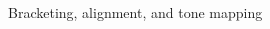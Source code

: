 \documentclass[12pt,a4paper,oneside,openright]{book}
\begin{document}
\begin{CJK}{UTF8}{}
\begin{figure}[htbp]
\begin{center}
\begin{minipage}[c]{.33\textwidth}
\begin{center}
      \end{center}
    \end{minipage}
    \caption{Bracketing, alignment, and tone mapping\label{fig:hdr}}
  \end{center}
\end{figure}


\end{CJK}
\end{document}
